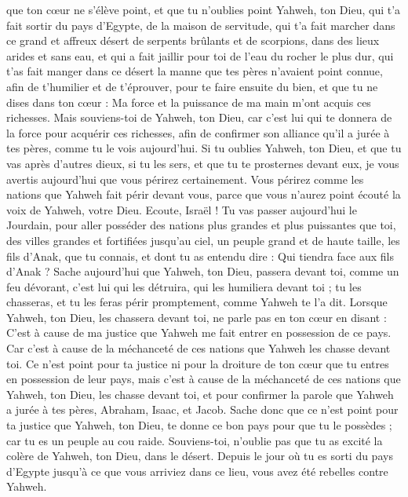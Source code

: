 \begin{multicols}{2}
que ton cœur ne s'élève point, et que tu n'oublies point Yahweh, ton Dieu, qui t'a fait sortir du pays d'Egypte, de la maison de servitude,
qui t'a fait marcher dans ce grand et affreux désert de serpents brûlants et de scorpions, dans des lieux arides et sans eau, et qui a fait jaillir pour toi de l'eau du rocher le plus dur,
qui t'as fait manger dans ce désert la manne que tes pères n'avaient point connue, afin de t'humilier et de t'éprouver, pour te faire ensuite du bien,
et que tu ne dises dans ton cœur : Ma force et la puissance de ma main m'ont acquis ces richesses.
Mais souviens-toi de Yahweh, ton Dieu, car c'est lui qui te donnera de la force pour acquérir ces richesses, afin de confirmer son alliance qu'il a jurée à tes pères, comme tu le vois aujourd'hui.
Si tu oublies Yahweh, ton Dieu, et que tu vas après d'autres dieux, si tu les sers, et que tu te prosternes devant eux, je vous avertis aujourd'hui que vous périrez certainement.
Vous périrez comme les nations que Yahweh fait périr devant vous, parce que vous n'aurez point écouté la voix de Yahweh, votre Dieu.
\VerseOne{}Ecoute, Israël ! Tu vas passer aujourd'hui le Jourdain, pour aller posséder des nations plus grandes et plus puissantes que toi, des villes grandes et fortifiées jusqu'au ciel,
un peuple grand et de haute taille, les fils d'Anak, que tu connais, et dont tu as entendu dire : Qui tiendra face aux fils d'Anak ?
Sache aujourd'hui que Yahweh, ton Dieu, passera devant toi, comme un feu dévorant, c'est lui qui les détruira, qui les humiliera devant toi ; tu les chasseras, et tu les feras périr promptement, comme Yahweh te l'a dit.
Lorsque Yahweh, ton Dieu, les chassera devant toi, ne parle pas en ton cœur en disant : C'est à cause de ma justice que Yahweh me fait entrer en possession de ce pays. Car c'est à cause de la méchanceté de ces nations que Yahweh les chasse devant toi.
Ce n'est point pour ta justice ni pour la droiture de ton cœur que tu entres en possession de leur pays, mais c'est à cause de la méchanceté de ces nations que Yahweh, ton Dieu, les chasse devant toi, et pour confirmer la parole que Yahweh a jurée à tes pères, Abraham, Isaac, et Jacob.
Sache donc que ce n'est point pour ta justice que Yahweh, ton Dieu, te donne ce bon pays pour que tu le possèdes ; car tu es un peuple au cou raide.
Souviens-toi, n'oublie pas que tu as excité la colère de Yahweh, ton Dieu, dans le désert. Depuis le jour où tu es sorti du pays d'Egypte jusqu'à ce que vous arriviez dans ce lieu, vous avez été rebelles contre Yahweh.

\end{multicols}
